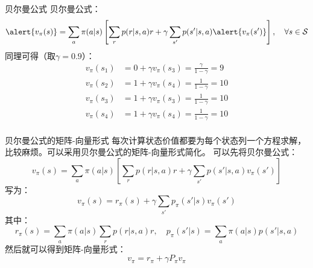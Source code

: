 \begin{frame}{贝尔曼公式}
    贝尔曼公式：
    \[
        \alert{v_\pi(s)}=\sum_a\pi(a|s)\left[\sum_r p(r|s,a)r+\gamma\sum_{s'}p(s'|s,a)\alert{v_{\pi}(s')}\right], \quad \forall s\in\mathcal{S}
    \]
    同理可得（取$\gamma=0.9$）：
    \[
        \begin{aligned}
            v_\pi(s_1)&=0+\gamma v_\pi(s_3)=\frac{\gamma}{1-\gamma}=9 \\
            v_\pi(s_2)&=1+\gamma v_\pi(s_4)=\frac{1}{1-\gamma}=10 \\
            v_\pi(s_3)&=1+\gamma v_\pi(s_3)=\frac{1}{1-\gamma}=10 \\
            v_\pi(s_4)&=1+\gamma v_\pi(s_4)=\frac{1}{1-\gamma}=10\\
        \end{aligned}
    \]

\end{frame}

\begin{frame}{贝尔曼公式的矩阵-向量形式}
    每次计算状态价值都要为每个状态列一个方程求解，比较麻烦。可以采用贝尔曼公式的矩阵-向量形式简化。
    可以先将贝尔曼公式：
    \[
        v_\pi(s)=\sum_a\pi(a|s)\left[\sum_r p(r|s,a)r+\gamma\sum_{s'}p(s'|s,a)v_{\pi}(s')\right]
    \]
    写为：
    \[
        v_\pi(s)=r_\pi(s)+\gamma\sum_{s'}p_\pi(s'|s)v_\pi(s')
    \]
    其中：
    \[
        r_\pi(s)=\sum_a\pi(a|s)\sum_r p(r|s,a)r, \quad p_\pi(s'|s)=\sum_a\pi(a|s)p(s'|s,a)
    \]
    然后就可以得到矩阵-向量形式：
    \[
        v_\pi=r_\pi+\gamma P_\pi v_\pi
    \]
\end{frame} 

